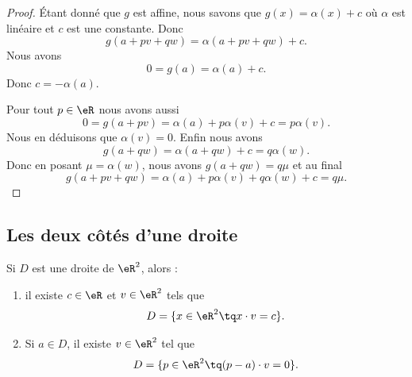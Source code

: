 \begin{proof}
	Étant donné que \( g\) est affine, nous savons que \( g(x)=\alpha(x)+c\) où \( \alpha\) est linéaire et \( c\) est une constante. Donc
	\begin{equation}
		g(a+pv+qw)=\alpha(a+pv+qw)+c.
	\end{equation}
	Nous avons
	\begin{equation}
		0=g(a)=\alpha(a)+c.
	\end{equation}
	Donc \( c=-\alpha(a)\).

	Pour tout \( p\in \eR\) nous avons aussi
	\begin{equation}
		0=g(a+pv)=\alpha(a)+p\alpha(v)+c=p\alpha(v).
	\end{equation}
	Nous en déduisons que \( \alpha(v)=0\). Enfin nous avons
	\begin{equation}
		g(a+qw)=\alpha(a+qw)+c=q\alpha(w).
	\end{equation}
	Donc en posant \( \mu=\alpha(w)\), nous avons \( g(a+qw)=q\mu\) et au final
	\begin{equation}
		g(a+pv+qw)=\alpha(a)+p\alpha(v)+q\alpha(w)+c=q\mu.
	\end{equation}
\end{proof}

\subsection{Les deux côtés d'une droite}


\begin{proposition}	\label{PROPooJSBKooJspdiF}
	Si \( D\) est une droite de \( \eR^2\), alors :
	\begin{enumerate}
		\item		\label{ITEMooEVCEooLrXKQQ}
		      il existe \( c\in \eR\) et \( v\in \eR^2\) tels que
		      \begin{equation}
			      D=\{ x\in \eR^2 \tq x\cdot v=c \}.
		      \end{equation}
		\item		\label{ITEMooNZPMooMCEllL}
		      Si \( a\in D\), il existe \( v\in \eR^2\) tel que
		      \begin{equation}
			      D=\{ p\in \eR^2\tq (p-a)\cdot v=0 \}.
		      \end{equation}
	\end{enumerate}
\end{proposition}

